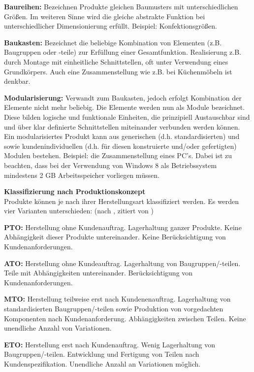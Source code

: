 \documentclass[12pt,a4paper,bibliography=totocnumbered,listof=totoc]{scrartcl}
\begin{document}
\begin{compactitem}
	\item \textbf{Baureihen:} Bezeichnen Produkte gleichen Baumusters mit unterschiedlichen Größen. Im weiteren Sinne wird die gleiche abstrakte Funktion bei unterschiedlicher Dimensionierung erfüllt. Beispiel: Konfektionsgrößen.
	\item \textbf{Baukasten:} Bezeichnet die beliebige Kombination von Elementen (z.B. Baugruppen oder -teile) zur Erfüllung einer Gesamtfunktion. Realisierung z.B. durch Montage mit einheitliche Schnittstellen, oft unter Verwendung eines Grundkörpers\citep{rapp99}. Auch eine Zusammenstellung wie z.B. bei Küchenmöbeln ist denkbar.
	\item \textbf{Modularisierung:} Verwandt zum Baukasten, jedoch erfolgt Kombination der Elemente nicht mehr beliebig. Die Elemente werden nun als Module bezeichnet. Diese bilden logische und funktionale Einheiten, die prinzipiell Austauschbar sind und über klar definierte Schnittstellen miteinander verbunden werden können. Ein modularisiertes Produkt kann aus generischen (d.h. standardisierten) und sowie kundenindividuellen (d.h. für diesen konstruierte und/oder gefertigten) Modulen bestehen. Beispiel: die Zusammenstellung eines PC's. Dabei ist zu beachten, dass bei der Verwendung von Windows 8 als Betriebssystem mindestens 2 GB Arbeitsspeicher vorliegen müssen. 
\end{compactitem}


\textbf{Klassifizierung nach Produktionskonzept}\\
Produkte können je nach ihrer Herstellungsart klassifiziert werden. Es werden vier Varianten unterschieden:
(nach \citealt{schuh06}, zitiert von \citealt{lutz11})
\begin{compactitem}
	\item \textbf{\ac{PTO}:} Herstellung ohne Kundenauftrag. Lagerhaltung ganzer Produkte. Keine Abhängigkeit dieser Produkte untereinander. Keine Berücksichtigung von Kundenanforderungen.
	\item \textbf{\ac{ATO}:} Herstellung ohne Kundeauftrag. Lagerhaltung von Baugruppen/-teilen. Teile mit Abhängigkeiten untereinander. Berücksichtigung von Kundenanforderungen.
	\item \textbf{\ac{MTO}:} Herstellung teilweise erst nach Kundenenauftrag. Lagerhaltung von standardisierten Baugruppen/-teilen sowie Produktion von vorgedachten Komponenten nach Kundenanforderung. Abhängigkeiten zwischen Teilen. Keine unendliche Anzahl von Variationen.
	\item \textbf{\ac{ETO}:} Herstellung erst nach Kundenauftrag. Wenig Lagerhaltung von Baugruppen/-teilen. Entwicklung und Fertigung von Teilen nach Kundenspezifikation. Unendliche Anzahl an Variationen möglich.
\end{compactitem}
\end{document}
